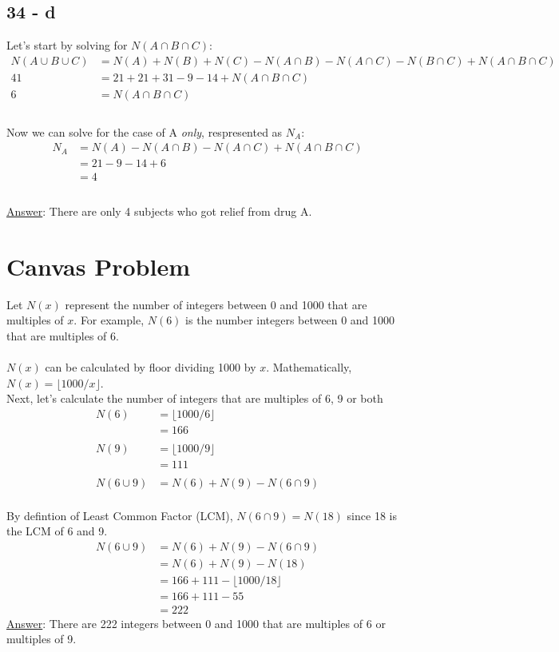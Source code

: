 \documentclass[12pt]{article}
\begin{document}
\subsection*{34 - d}
Let's start by solving for $N(A \cap B \cap C)$:
\begin{align*}
  N(A \cup B\cup C) &= N(A) + N(B) + N(C) - N(A\cap B) - N(A\cap C) - N(B\cap C) + N(A\cap B\cap C) \\
  41 &= 21+21+31-9-14 + N(A\cap B\cap C) \\
  6 &= N(A\cap B\cap C) \\
\end{align*}
\\
Now we can solve for the case of A \textit{only}, respresented as $N_A$:
\begin{align*}
  N_A &= N(A) - N(A \cap B) - N(A \cap C) + N(A \cap B \cap C) \\
  &= 21 - 9 - 14 + 6 \\
  &= 4 \\
\end{align*}
\\ 
\underline{Answer}: There are only 4 subjects who got relief from drug A.
\newpage
\section*{Canvas Problem}
Let $N(x)$ represent the number of integers between 0 and 1000 that are multiples of $x$. 
For example, $N(6)$ is the number integers between 0 and 1000 that are multiples of 6.
\\ \\
$N(x)$ can be calculated by floor dividing 1000 by $x$. Mathematically, $N(x) = \lfloor 1000 / x \rfloor$.
\\
Next, let's calculate the number of integers that are multiples of 6, 9 or both 
\begin{align*}
  N(6) &= \lfloor 1000 / 6 \rfloor \\
  &= 166 \\
  \ \\
  N(9) &= \lfloor 1000 / 9 \rfloor \\
  &= 111 \\
  \ \\
  N(6 \cup 9) &= N(6) + N(9) - N(6 \cap 9)
\end{align*}
\\
By defintion of Least Common Factor (LCM), $N(6 \cap 9) = N(18)$ since 18 is the LCM of 6 and 9.
\\
\begin{align*}
  N(6 \cup 9) &= N(6) + N(9) - N(6 \cap 9) \\
  &= N(6) + N(9) - N(18) \\
  &= 166 + 111 - \lfloor 1000 / 18 \rfloor \\
  &= 166 + 111 - 55 \\
  &= 222
\end{align*}
\underline{Answer}: There are 222 integers between 0  and 1000 that are multiples of 6 or multiples of 9.
\end{document}
